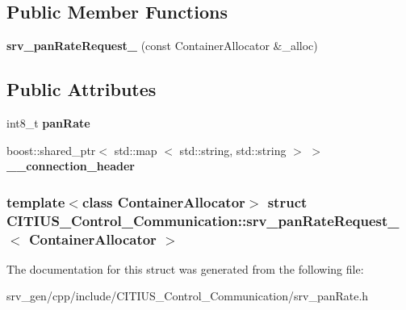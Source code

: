 \subsection*{\-Public \-Member \-Functions}
\begin{DoxyCompactItemize}
\item 
\hypertarget{struct_c_i_t_i_u_s___control___communication_1_1srv__pan_rate_request___a91aae5ddaa8451e42367d794b7c5f57f}{{\bfseries srv\-\_\-pan\-Rate\-Request\-\_\-} (const \-Container\-Allocator \&\-\_\-alloc)}\label{struct_c_i_t_i_u_s___control___communication_1_1srv__pan_rate_request___a91aae5ddaa8451e42367d794b7c5f57f}

\end{DoxyCompactItemize}
\subsection*{\-Public \-Attributes}
\begin{DoxyCompactItemize}
\item 
\hypertarget{struct_c_i_t_i_u_s___control___communication_1_1srv__pan_rate_request___a042d00345a53fa87bf297858eb21b1b2}{int8\-\_\-t {\bfseries pan\-Rate}}\label{struct_c_i_t_i_u_s___control___communication_1_1srv__pan_rate_request___a042d00345a53fa87bf297858eb21b1b2}

\item 
\hypertarget{struct_c_i_t_i_u_s___control___communication_1_1srv__pan_rate_request___ad655dd2671093f35f94570fe84f0b322}{boost\-::shared\-\_\-ptr$<$ std\-::map\*
$<$ std\-::string, std\-::string $>$ $>$ {\bfseries \-\_\-\-\_\-connection\-\_\-header}}\label{struct_c_i_t_i_u_s___control___communication_1_1srv__pan_rate_request___ad655dd2671093f35f94570fe84f0b322}

\end{DoxyCompactItemize}
\subsubsection*{template$<$class Container\-Allocator$>$ struct C\-I\-T\-I\-U\-S\-\_\-\-Control\-\_\-\-Communication\-::srv\-\_\-pan\-Rate\-Request\-\_\-$<$ Container\-Allocator $>$}



\-The documentation for this struct was generated from the following file\-:\begin{DoxyCompactItemize}
\item 
srv\-\_\-gen/cpp/include/\-C\-I\-T\-I\-U\-S\-\_\-\-Control\-\_\-\-Communication/srv\-\_\-pan\-Rate.\-h\end{DoxyCompactItemize}

